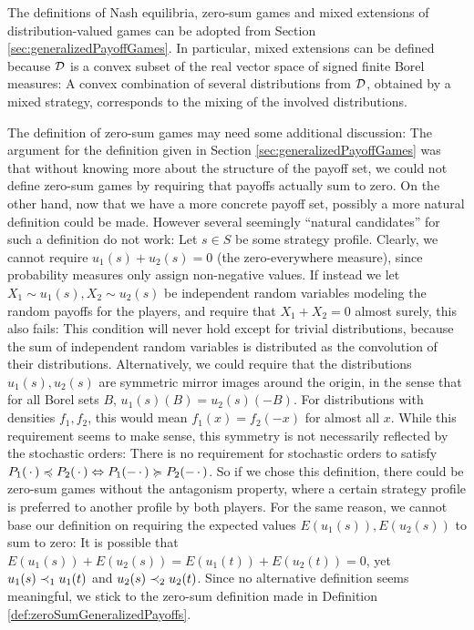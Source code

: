 \documentclass[a4paper,DIV=11,abstracton,twoside=semi]{scrreprt}
\theoremstyle{definition}
\begin{document}
    The definitions of Nash equilibria, zero-sum games and mixed extensions of distribution-valued games can be adopted from Section \ref{sec:generalizedPayoffGames}.
    In particular, mixed extensions can be defined because $\mathcal{D}$ is a convex subset of the real vector space of signed finite Borel measures: A convex combination of several distributions from $\mathcal{D}$, obtained by a mixed strategy, corresponds to the mixing of the involved distributions.
    
    The definition of zero-sum games may need some additional discussion: The argument for the definition given in Section \ref{sec:generalizedPayoffGames} was that without knowing more about the structure of the payoff set, we could not define zero-sum games by requiring that payoffs actually sum to zero.
    On the other hand, now that we have a more concrete payoff set, possibly a more natural definition could be made.    
    However several seemingly “natural candidates” for such a definition do not work: Let $s \in S$ be some strategy profile.
    Clearly, we cannot require $u_1(s) + u_2(s) = 0$ (the zero-everywhere measure), since probability measures only assign non-negative values.
    If instead we let $X_1 \sim u_1(s), X_2 \sim u_2(s)$ be independent random variables modeling the random payoffs for the players, and require that $X_1 + X_2 = 0$ almost surely, this also fails: This condition will never hold except for trivial distributions, because the sum of independent random variables is distributed as the convolution of their distributions.
    Alternatively, we could require that the distributions $u_1(s), u_2(s)$ are symmetric mirror images around the origin, in the sense that for all Borel sets $B$, $u_1(s)(B) = u_2(s)(-B)$. For distributions with densities $f_1, f_2$, this would mean $f_1(x) = f_2(-x)$ for almost all $x$.
    While this requirement seems to make sense, this symmetry is not necessarily reflected by the stochastic orders: There is no requirement for stochastic orders to satisfy $P_1(\,\cdot\,) \preccurlyeq P_2(\,\cdot\,) \Leftrightarrow P_1(-\,\cdot\,) \succcurlyeq P_2(-\,\cdot\,)$. So if we chose this definition, there could be zero-sum games without the antagonism property, where a certain strategy profile is preferred to another profile by both players.
    For the same reason, we cannot base our definition on requiring the expected values $E(u_1(s)), E(u_2(s))$ to sum to zero: It is possible that $E(u_1(s)) + E(u_2(s)) = E(u_1(t)) + E(u_2(t)) = 0$, yet $u_1(s) \dstrnonpref_1 u_1(t)$ and $u_2(s) \dstrnonpref_2 u_2(t)$.
    Since no alternative definition seems meaningful, we stick to the zero-sum definition made in Definition \ref{def:zeroSumGeneralizedPayoffs}.
\end{document}
